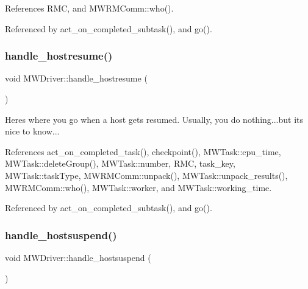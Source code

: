 References R\+MC, and M\+W\+R\+M\+Comm\+::who().



Referenced by act\+\_\+on\+\_\+completed\+\_\+subtask(), and go().

\mbox{\label{classMWDriver_a0e1ef56017457e099e5947e81dd5d761}} 
\subsubsection{\texorpdfstring{handle\+\_\+hostresume()}{handle\_hostresume()}}
{\footnotesize\ttfamily void M\+W\+Driver\+::handle\+\_\+hostresume (\begin{DoxyParamCaption}{ }\end{DoxyParamCaption})\hspace{0.3cm}{\ttfamily [virtual]}}

Here\textquotesingle{}s where you go when a host gets resumed. Usually, you do nothing...but it\textquotesingle{}s nice to know... 

References act\+\_\+on\+\_\+completed\+\_\+task(), checkpoint(), M\+W\+Task\+::cpu\+\_\+time, M\+W\+Task\+::delete\+Group(), M\+W\+Task\+::number, R\+MC, task\+\_\+key, M\+W\+Task\+::task\+Type, M\+W\+R\+M\+Comm\+::unpack(), M\+W\+Task\+::unpack\+\_\+results(), M\+W\+R\+M\+Comm\+::who(), M\+W\+Task\+::worker, and M\+W\+Task\+::working\+\_\+time.



Referenced by act\+\_\+on\+\_\+completed\+\_\+subtask(), and go().

\mbox{\label{classMWDriver_a91c21e0a4aba8ce4e03ebf7c3064f6b5}} 
\subsubsection{\texorpdfstring{handle\+\_\+hostsuspend()}{handle\_hostsuspend()}}
{\footnotesize\ttfamily void M\+W\+Driver\+::handle\+\_\+hostsuspend (\begin{DoxyParamCaption}{ }\end{DoxyParamCaption})\hspace{0.3cm}{\ttfamily [virtual]}}

